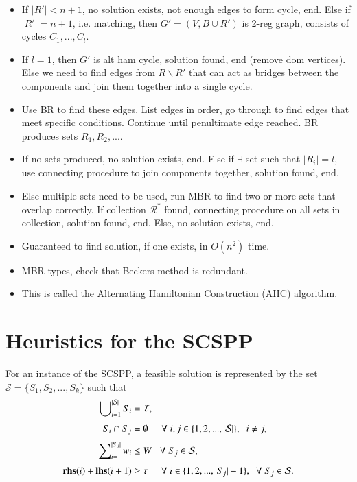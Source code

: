 \documentclass{elsarticle}
\begin{document}
\begin{itemize}
	\item If $|R'| < n+1$, no solution exists, not enough edges to form cycle, end. Else if $|R'| = n+1$, i.e. matching, then $G' = (V, B \cup R')$ is 2-reg graph, consists of cycles $C_1,...,C_l$.
	\item If $l = 1$, then $G'$ is alt ham cycle, solution found, end (remove dom vertices). Else we need to find edges from $R\backslash R'$ that can act as bridges between the components and join them together into a single cycle. 
	\item Use BR to find these edges. List edges in order, go through to find edges that meet specific conditions. Continue until penultimate edge reached. BR produces sets $R_1, R_2,...$.
	\item If no sets produced, no solution exists, end. Else if $\exists$ set such that $|R_i| = l$, use connecting procedure to join components together, solution found, end.
	\item Else multiple sets need to be used, run MBR to find two or more sets that overlap correctly. If collection $\mathcal{R}^*$ found, connecting procedure on all sets in collection, solution found, end. Else, no solution exists, end.
	\item Guaranteed to find solution, if one exists, in $O(n^2)$ time.
	\item MBR types, check that Beckers method is redundant.
	\item This is called the Alternating Hamiltonian Construction (AHC) algorithm.
\end{itemize}

\section{Heuristics for the SCSPP}
\label{sec:scspp}
For an instance of the SCSPP, a feasible solution is represented by the set $\mathcal{S} = \{S_1, S_2, ..., S_k\}$ such that
\begin{subequations}
	\begin{align}
	\bigcup\nolimits_{i=1}^{|\mathcal{S}|} S_i &= \mathcal{I}, \label{eqn:packall}\\[3pt]
	S_i \cap S_j &= \emptyset \hspace{5mm} \forall \hspace{1mm} i, j \in \{1, 2, ..., |\mathcal{S}|\}, \hspace{2mm} i \neq j, \label{eqn:nooverlap} \\[3pt]
	\sum\nolimits_{i=1}^{|S_j|}w_i & \leq W \hspace{3mm} \forall \hspace{1mm} S_j \in \mathcal{S}, \label{eqn:capacity} \\[3pt]
	\textup{\textbf{rhs}}(i) + \textup{\textbf{lhs}}(i+1) &\geq \tau \hspace {5mm} \forall \hspace{1mm} i \in \{1, 2, ..., |S_j|-1\}, \hspace{2mm} \forall \hspace{1mm} S_j \in \mathcal{S}. \label{eqn:vscstrip}
	\end{align}
\end{subequations}
\end{document}

